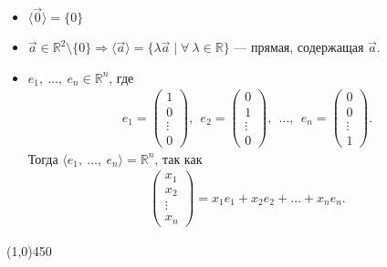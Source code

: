 \documentclass[a4paper,12pt]{article}
\newcommand{\R}{\mathbb{R}}
\begin{document}
	\begin{itemize}
		\item $\langle \vec{0} \rangle = \{0\}$
		\item $\vec{a} \in \R^2\setminus\{0\} \Rightarrow \langle \vec{a} \rangle = \{\lambda \vec{a}\mid \forall\ \lambda \in \R \}$ — прямая, содержащая $\vec{a}$.
		\item $e_1,\ \ldots,\ e_n \in \R^n$, где 
		\begin{gather*}
		e_1 = 
		\begin{pmatrix}
		1 \\
		0 \\
		\vdots \\
		0
		\end{pmatrix}, \ \ 
		e_2 = 
		\begin{pmatrix}
		0 \\
		1 \\
		\vdots \\
		0
		\end{pmatrix}, \ \ \ldots, \ \  
		e_n = 
		\begin{pmatrix}
		0 \\
		0 \\
		\vdots \\
		1
		\end{pmatrix}.
		\end{gather*}
		Тогда $\langle e_1,\ \ldots,\ e_n \rangle = \R^n$, так как
		\begin{gather*}
		\begin{pmatrix}
		x_1 \\
		x_2 \\
		\vdots \\
		x_n
		\end{pmatrix} = x_1e_1 + x_2 e_2 + \ldots + x_n e_n.
		\end{gather*}
	\end{itemize}	
	\begin{center}
		\line(1,0){450}
	\end{center}
\end{document}

